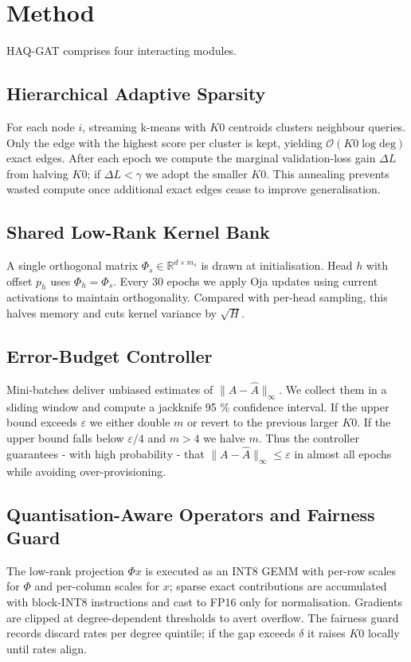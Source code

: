 \documentclass{article} %
\begin{document}
\section{Method}
\label{sec:method}
HAQ-GAT comprises four interacting modules.

\subsection{Hierarchical Adaptive Sparsity}
For each node \(i\), streaming k-means with \(K0\) centroids clusters neighbour queries. Only the edge with the highest score per cluster is kept, yielding \(\mathcal{O}(K0 \log \mathrm{deg})\) exact edges. After each epoch we compute the marginal validation-loss gain \(\Delta L\) from halving \(K0\); if \(\Delta L < \gamma\) we adopt the smaller \(K0\). This annealing prevents wasted compute once additional exact edges cease to improve generalisation.

\subsection{Shared Low-Rank Kernel Bank}
A single orthogonal matrix \(\Phi_s \in \mathbb{R}^{d\times m_s}\) is drawn at initialisation. Head \(h\) with offset \(p_h\) uses \(\Phi_h = \Phi_s\). Every 30 epochs we apply Oja updates using current activations to maintain orthogonality. Compared with per-head sampling, this halves memory and cuts kernel variance by \(\sqrt{H}\).

\subsection{Error-Budget Controller}
Mini-batches deliver unbiased estimates of \(\lVert A - \hat{A} \rVert_\infty\). We collect them in a sliding window and compute a jackknife 95 \% confidence interval. If the upper bound exceeds \(\varepsilon\) we either double \(m\) or revert to the previous larger \(K0\). If the upper bound falls below \(\varepsilon/4\) and \(m > 4\) we halve \(m\). Thus the controller guarantees - with high probability - that \(\lVert A - \hat{A} \rVert_\infty \le \varepsilon\) in almost all epochs while avoiding over-provisioning.

\subsection{Quantisation-Aware Operators and Fairness Guard}
The low-rank projection \(\Phi x\) is executed as an INT8 GEMM with per-row scales for \(\Phi\) and per-column scales for \(x\); sparse exact contributions are accumulated with block-INT8 instructions and cast to FP16 only for normalisation. Gradients are clipped at degree-dependent thresholds to avert overflow. The fairness guard records discard rates per degree quintile; if the gap exceeds \(\delta\) it raises \(K0\) locally until rates align.
\end{document}
